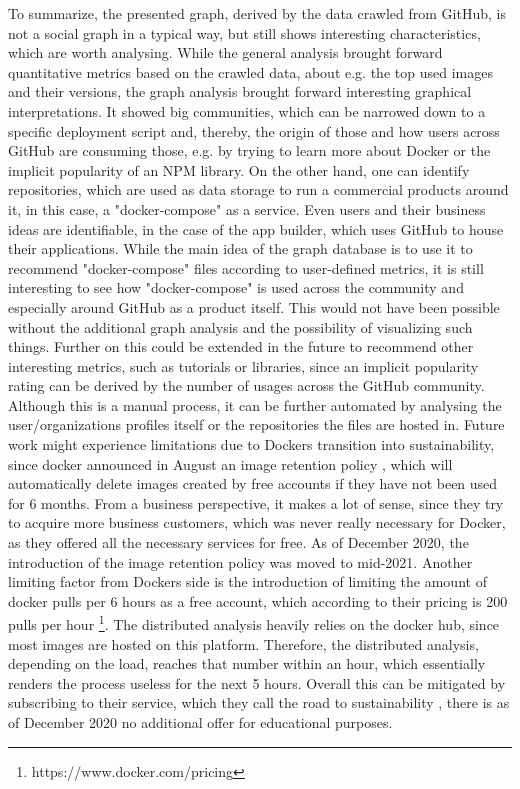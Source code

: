 To summarize, the presented graph, derived by the data crawled from GitHub, is not a social graph in a typical way, but still shows interesting characteristics, which are worth analysing. While the general analysis brought forward quantitative metrics based on the crawled data, about e.g. the top used images and their versions, the graph analysis brought forward interesting graphical interpretations. It showed big communities, which can be narrowed down to a specific deployment script and, thereby, the origin of those and how users across GitHub are consuming those, e.g. by trying to learn more about Docker or the implicit popularity of an NPM library. On the other hand, one can identify repositories, which are used as data storage to run a commercial products around it, in this case, a "docker-compose" as a service. Even users and their business ideas are identifiable, in the case of the app builder, which uses GitHub to house their applications. While the main idea of the graph database is to use it to recommend "docker-compose" files according to user-defined metrics, it is still interesting to see how "docker-compose" is used across the community and especially around GitHub as a product itself. This would not have been possible without the additional graph analysis and the possibility of visualizing such things. Further on this could be extended in the future to recommend other interesting metrics, such as tutorials or libraries, since an implicit popularity rating can be derived by the number of usages across the GitHub community. Although this is a manual process, it can be further automated by analysing the user/organizations profiles itself or the repositories the files are hosted in.
\label{sec:futureDocker}
Future work might experience limitations due to Dockers transition into sustainability, since docker announced in August an image retention policy \cite{dockerBusiness}, which will automatically delete images created by free accounts if they have not been used for 6 months. From a business perspective, it makes a lot of sense, since they try to acquire more business customers, which was never really necessary for Docker, as they offered all the necessary services for free. As of December 2020, the introduction of the image retention policy was moved to mid-2021. Another limiting factor from Dockers side is the introduction of limiting the amount of docker pulls per 6 hours as a free account, which according to their pricing is 200 pulls per hour \footnote{https://www.docker.com/pricing}. The distributed analysis heavily relies on the docker hub, since most images are hosted on this platform. Therefore, the distributed analysis, depending on the load, reaches that number within an hour, which essentially renders the process useless for the next 5 hours. Overall this can be mitigated by subscribing to their service, which they call the road to sustainability \cite{dockerChapter}, there is as of December 2020 no additional offer for educational purposes.
